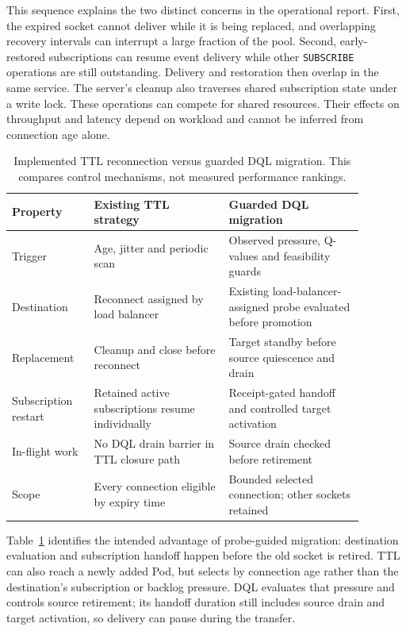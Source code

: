This sequence explains the two distinct concerns in the operational report.
First, the expired socket cannot deliver while it is being replaced, and
overlapping recovery intervals can interrupt a large fraction of the pool.
Second, early-restored subscriptions can resume event delivery while other
\texttt{SUBSCRIBE} operations are still outstanding. Delivery and restoration
then overlap in the same service. The server's cleanup also traverses shared
subscription state under a write lock. These operations can compete for shared resources. Their effects on throughput
and latency depend on workload and cannot be inferred from connection age alone.

\begin{table}[!htbp]
  \centering
  \small
  \renewcommand{\arraystretch}{1.18}
  \caption{Implemented TTL reconnection versus guarded DQL migration.
  This compares control mechanisms, not measured performance rankings.}
  \label{tab:ttl-mechanism-comparison}
  \begin{tabular}{p{0.20\linewidth}p{0.34\linewidth}p{0.34\linewidth}}
    \toprule
    Property & Existing TTL strategy & Guarded DQL migration \\
    \midrule
    Trigger & Age, jitter and periodic scan & Observed pressure, Q-values and feasibility guards \\
    Destination & Reconnect assigned by load balancer & Existing load-balancer-assigned probe evaluated before promotion \\
    Replacement & Cleanup and close before reconnect & Target standby before source quiescence and drain \\
    Subscription restart & Retained active subscriptions resume individually & Receipt-gated handoff and controlled target activation \\
    In-flight work & No DQL drain barrier in TTL closure path & Source drain checked before retirement \\
    Scope & Every connection eligible by expiry time & Bounded selected connection; other sockets retained \\
    \bottomrule
  \end{tabular}
\end{table}


Table~\ref{tab:ttl-mechanism-comparison} identifies the intended advantage of
probe-guided migration: destination evaluation and subscription handoff happen
before the old socket is retired. TTL can also reach a newly added Pod, but
selects by connection age rather than the destination's subscription or backlog
pressure. DQL evaluates that pressure and controls source retirement; its
handoff duration still includes source drain and target activation, so delivery
can pause during the transfer.

